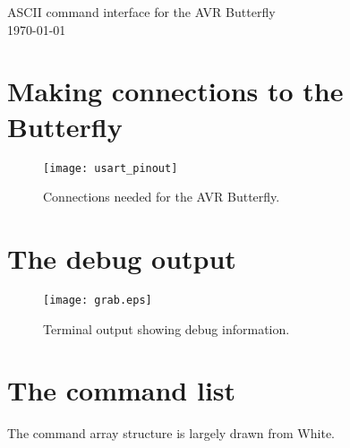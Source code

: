
\graphicspath{
              {figs/} %
              {pngs/} %
}







\begin{center}
	{\huge ASCII command interface for the AVR Butterfly}\\
	\today
\end{center}

\tableofcontents


\section{Making connections to the Butterfly}

\begin{figure}[ht]
    \begin{center}
        \texttt{[image: usart\_pinout]}
        \caption{Connections needed for the AVR Butterfly.\label{fig:connections}}
    \end{center}
\end{figure}


\clearpage{}
\section{The debug output}

\begin{figure}[ht]
    \begin{center}
        \texttt{[image: grab.eps]}
        \caption{Terminal output showing debug information.\label{fig:termgrab}}
    \end{center}
\end{figure}




\clearpage{}
\section{The command list}
The command array structure is largely drawn from White\cite{bok:white2012}.

